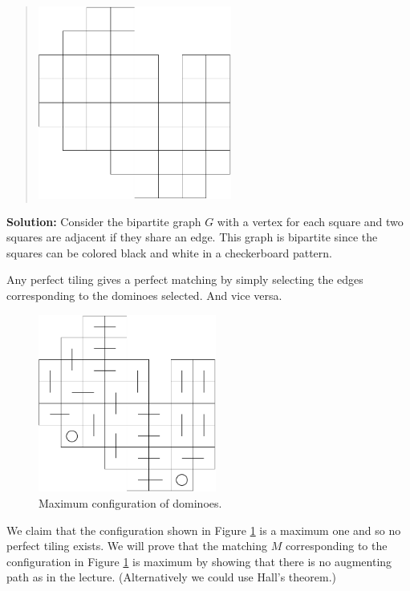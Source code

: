 \documentclass[12pt]{article}
\begin{document}
\begin{enumerate}
\begin{quote}
\begin{enumerate}
\begin{center}
\includegraphics[height=2.5in]{../figures/domino}
\end{center}
\end{enumerate}
\end{quote}
\textbf{Solution: }
 Consider the bipartite graph $G$ with a vertex for each square
  and two squares are adjacent if they share an edge. This graph is
  bipartite since the squares can be colored black and white in a
  checkerboard pattern.

Any perfect tiling gives a perfect matching by simply selecting the
edges corresponding to the dominoes selected. And vice versa.

\begin{figure}[ht]
\begin{center}
\includegraphics[height=2.3in]{../figures/domino2}
\end{center}
\caption{Maximum configuration of dominoes. \label{fig:domino2}}
\end{figure}

We claim that the configuration shown in Figure \ref{fig:domino2} is a
maximum one and so no perfect tiling exists. We will prove that the
matching $M$ corresponding to the configuration in Figure
\ref{fig:domino2} is maximum by showing that there is no augmenting
path as in the lecture. (Alternatively we could use Hall's theorem.)


\end{enumerate}
\end{document}

